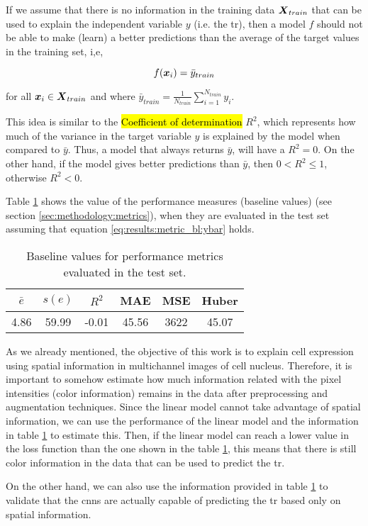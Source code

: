 

\graphicspath{{./Sections/Results/Resources/}}

If we assume that there is no information in the training data $\boldsymbol{X}_{train}$ that can be used to explain the independent variable $y$ (i.e. the \gls{tr}), then a model $f$ should not be able to make (learn) a better predictions than the average of the target values in the training set, i,e,

\begin{equation}
  f(\boldsymbol{x}_i)=\bar{y}_{train}
  \label{eq:results:metric_bl:ybar}
\end{equation}

\noindent for all $\boldsymbol{x}_i \in \boldsymbol{X}_{train}$ and where $\bar{y}_{train}=\frac{1}{N_{train}}\sum_{i=1}^{N_{train}}y_i$.

This idea is similar to the \hl{Coefficient of determination} $R^2$, which represents how much of the variance in the target variable $y$ is explained by the model when compared to $\bar{y}$.
Thus, a model that always returns $\bar{y}$, will have a $R^2=0$. On the other hand, if the model gives better predictions than $\bar{y}$, then $0 < R^2 \leq 1$, otherwise $R^2 < 0$.

Table \ref{table:results:metric_bl_vals} shows the value of the performance measures (baseline values) (see section \ref{sec:methodology:metrics}), when they are evaluated in the test set assuming that equation \ref{eq:results:metric_bl:ybar} holds.

\begin{table}[!ht]
  \centering
  \begin{tabular}{c|c|c|c|c|c}
    \hline
    $\bar{e}$ & $s(e)$ & $R^2$ & MAE & MSE & Huber \\
    \hline
     4.86 & 59.99 & -0.01 & 45.56 & 3622 & 45.07 \\
    \hline
  \end{tabular}
  \caption{Baseline values for performance metrics evaluated in the test set.}
  \label{table:results:metric_bl_vals}
\end{table}

As we already mentioned, the objective of this work is to explain cell expression using spatial information in multichannel images of cell nucleus.
Therefore, it is important to somehow estimate how much information related with the pixel intensities (color information) remains in the data after preprocessing and augmentation techniques.
Since the linear model cannot take advantage of spatial information, we can use the performance of the linear model and the information in table \ref{table:results:metric_bl_vals} to estimate this.
Then, if the linear model can reach a lower value in the loss function than the one shown in the table \ref{table:results:metric_bl_vals}, this means that there is still color information in the data that can be used to predict the \gls{tr}.

On the other hand, we can also use the information provided in table \ref{table:results:metric_bl_vals} to validate that the \glspl{cnn} are actually capable of predicting the \gls{tr} based only on spatial information.
